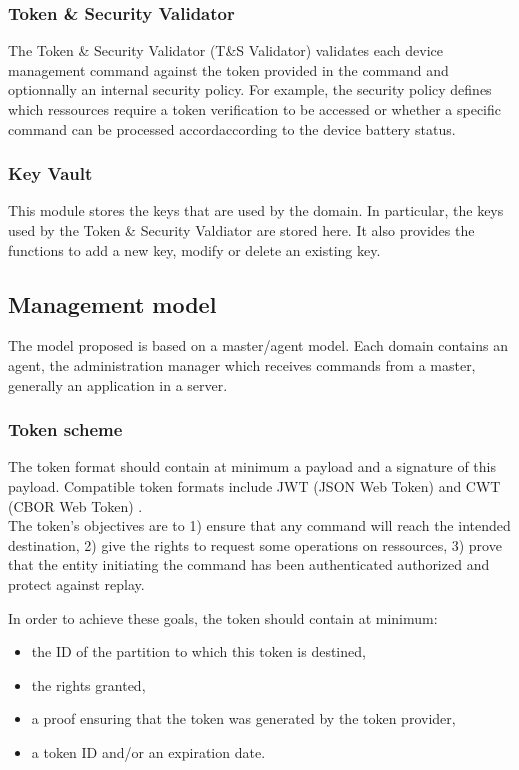 \documentclass[conference]{IEEEtran}
\begin{document}
\subsubsection{Token \& Security Validator}
\label{sec:Token_Validator}
The Token \& Security Validator (T\&S Validator) validates each device management command against the token provided in the command and optionnally an internal security policy. For example, the security policy defines which ressources require a token verification to be accessed or whether a specific command can be processed accordaccording to the device battery status. 

\subsubsection{Key Vault}
\label{sec:Key_Vault}
This module stores the keys that are used by the domain. In particular, the keys used by the Token \& Security Valdiator are stored here. It also provides the functions to add a new key, modify or delete an existing key.

\subsection{Management model}
\label{sec:Management_model}
The model proposed is based on a master/agent model. Each domain contains an agent, the administration manager which receives commands from a master, generally an application in a server.
\subsubsection{Token scheme}
The token format should contain at minimum a payload and a signature of this payload. Compatible token formats include JWT (JSON Web Token) \cite{rfc7519_jwt_2015} and CWT (CBOR Web Token) \cite{rfc_CWT_2017}.\\

The token's objectives are to 1) ensure that any command will reach the intended destination, 2) give the rights to request some operations on ressources, 3) prove that the entity initiating the command has been authenticated authorized and protect against replay.

In order to achieve these goals, the token should contain at minimum:
\begin{itemize}
    \item the ID of the partition to which this token is destined,
    \item the rights granted,
    \item a proof ensuring that the token was generated by the token provider,
    \item a token ID and/or an expiration date.
\end{itemize}
\end{document}
